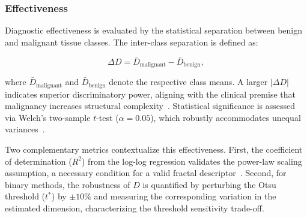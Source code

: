 \subsubsection{Effectiveness}
Diagnostic effectiveness is evaluated by the statistical separation between benign and malignant tissue classes. The inter-class separation is defined as:

\begin{equation}
  \Delta D
    = \bar{D}_{\text{malignant}} - \bar{D}_{\text{benign}},
  \label{eq:delta_d}
\end{equation}

\noindent where $\bar{D}_{\text{malignant}}$ and $\bar{D}_{\text{benign}}$ denote the respective class means. A larger $|\Delta D|$ indicates superior discriminatory power, aligning with the clinical premise that malignancy increases structural complexity~\cite{Lopes2011,Rangayyan2007}. Statistical significance is assessed via Welch's two-sample $t$-test ($\alpha = 0.05$), which robustly accommodates unequal variances~\cite{Welch1947}.

Two complementary metrics contextualize this effectiveness. First, the coefficient of determination ($R^{2}$) from the log-log regression validates the power-law scaling assumption, a necessary condition for a valid fractal descriptor~\cite{Lopes2011}. Second, for binary methods, the robustness of $D$ is quantified by perturbing the Otsu threshold ($t^{*}$) by $\pm 10\%$ and measuring the corresponding variation in the estimated dimension, characterizing the threshold sensitivity trade-off.